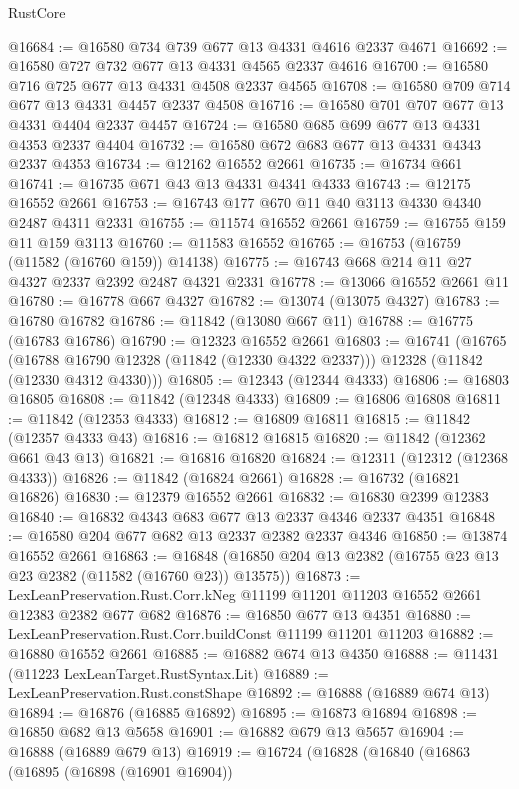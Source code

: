 \begin{lexlean}{RustCore}
\begin{coremodule}
@16684 := @16580 @734 @739 @677 @13 @4331 @4616 @2337 @4671
@16692 := @16580 @727 @732 @677 @13 @4331 @4565 @2337 @4616
@16700 := @16580 @716 @725 @677 @13 @4331 @4508 @2337 @4565
@16708 := @16580 @709 @714 @677 @13 @4331 @4457 @2337 @4508
@16716 := @16580 @701 @707 @677 @13 @4331 @4404 @2337 @4457
@16724 := @16580 @685 @699 @677 @13 @4331 @4353 @2337 @4404
@16732 := @16580 @672 @683 @677 @13 @4331 @4343 @2337 @4353
@16734 := @12162 @16552 @2661
@16735 := @16734 @661
@16741 := @16735 @671 @43 @13 @4331 @4341 @4333
@16743 := @12175 @16552 @2661
@16753 := @16743 @177 @670 @11 @40 @3113 @4330 @4340 @2487 @4311 @2331
@16755 := @11574 @16552 @2661
@16759 := @16755 @159 @11 @159 @3113
@16760 := @11583 @16552
@16765 := @16753 (@16759 (@11582 (@16760 @159)) @14138)
@16775 := @16743 @668 @214 @11 @27 @4327 @2337 @2392 @2487 @4321 @2331
@16778 := @13066 @16552 @2661 @11
@16780 := @16778 @667 @4327
@16782 := @13074 (@13075 @4327)
@16783 := @16780 @16782
@16786 := @11842 (@13080 @667 @11)
@16788 := @16775 (@16783 @16786)
@16790 := @12323 @16552 @2661
@16803 := @16741
    (@16765
      (@16788 @16790 @12328 (@11842 (@12330 @4322 @2337)))
      @12328
      (@11842 (@12330 @4312 @4330)))
@16805 := @12343 (@12344 @4333)
@16806 := @16803 @16805
@16808 := @11842 (@12348 @4333)
@16809 := @16806 @16808
@16811 := @11842 (@12353 @4333)
@16812 := @16809 @16811
@16815 := @11842 (@12357 @4333 @43)
@16816 := @16812 @16815
@16820 := @11842 (@12362 @661 @43 @13)
@16821 := @16816 @16820
@16824 := @12311 (@12312 (@12368 @4333))
@16826 := @11842 (@16824 @2661)
@16828 := @16732 (@16821 @16826)
@16830 := @12379 @16552 @2661
@16832 := @16830 @2399 @12383
@16840 := @16832 @4343 @683 @677 @13 @2337 @4346 @2337 @4351
@16848 := @16580 @204 @677 @682 @13 @2337 @2382 @2337 @4346
@16850 := @13874 @16552 @2661
@16863 := @16848 (@16850 @204 @13 @2382 (@16755 @23 @13 @23 @2382 (@11582 (@16760 @23)) @13575))
@16873 := LexLeanPreservation.Rust.Corr.kNeg
    @11199
    @11201
    @11203
    @16552
    @2661
    @12383
    @2382
    @677
    @682
@16876 := @16850 @677 @13 @4351
@16880 := LexLeanPreservation.Rust.Corr.buildConst @11199 @11201 @11203
@16882 := @16880 @16552 @2661
@16885 := @16882 @674 @13 @4350
@16888 := @11431 (@11223 LexLeanTarget.RustSyntax.Lit)
@16889 := LexLeanPreservation.Rust.constShape
@16892 := @16888 (@16889 @674 @13)
@16894 := @16876 (@16885 @16892)
@16895 := @16873 @16894
@16898 := @16850 @682 @13 @5658
@16901 := @16882 @679 @13 @5657
@16904 := @16888 (@16889 @679 @13)
@16919 := @16724
    (@16828
      (@16840
        (@16863
          (@16895
            (@16898 (@16901 @16904))

\end{coremodule}
\end{lexlean}
